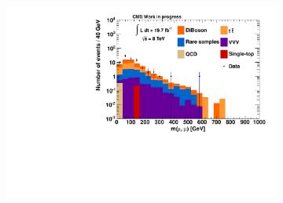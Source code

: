 \begin{figure}[htb!]
  \centering
  \begin{subfigure}[b]{0.495\textwidth}
    \centering
    \includegraphics[width=\textwidth]{plots/CR6_m_mumu_nofakes.pdf}
    \caption{\label{fig:CRBVC_m_mumu_nofakes}}
  \end{subfigure}


\end{figure}
